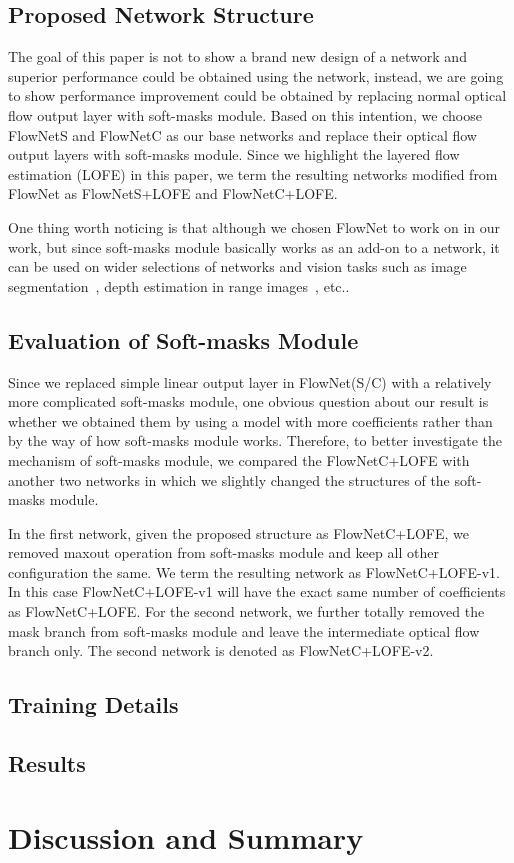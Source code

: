 \documentclass[10pt,twocolumn,letterpaper]{article}
\begin{document}
\subsection{Proposed Network Structure}
The goal of this paper is not to show a brand new design of a network and superior performance could be obtained using the network, instead, we are going to show performance improvement could be obtained by replacing normal optical flow output layer with soft-masks module. Based on this intention, we choose FlowNetS and FlowNetC as our base networks and replace their optical flow output layers with soft-masks module. Since we highlight the layered flow estimation (LOFE) in this paper, we term the resulting networks modified from FlowNet as FlowNetS+LOFE and FlowNetC+LOFE. 

One thing worth noticing is that although we chosen FlowNet to work on in our work, but since soft-masks module basically works as an add-on to a network, it can be used on wider selections of networks and vision tasks such as image segmentation~\cite{long2015fully}\cite{noh2015learning}, depth estimation in range images~\cite{eigen2014depth}\cite{eigen2015predicting}, etc..

\subsection{Evaluation of Soft-masks Module}
Since we replaced simple linear output layer in FlowNet(S/C) with a relatively more complicated soft-masks module, one obvious question about our result is whether we obtained them by using a model with more coefficients rather than by the way of how soft-masks module works. Therefore, to better investigate the mechanism of soft-masks module, we compared the FlowNetC+LOFE with another two networks in which we slightly changed the structures of the soft-masks module.

In the first network, given the proposed structure as FlowNetC+LOFE, we removed maxout operation from soft-masks module and keep all other configuration the same. We term the resulting network as FlowNetC+LOFE-v1. In this case FlowNetC+LOFE-v1 will have the exact same number of coefficients as FlowNetC+LOFE. For the second network, we further totally removed the mask branch from soft-masks module and leave the intermediate optical flow branch only. The second network is denoted as FlowNetC+LOFE-v2.  


\subsection{Training Details}

\subsection{Results}

\section{Discussion and Summary}

{\small


}
\end{document}
